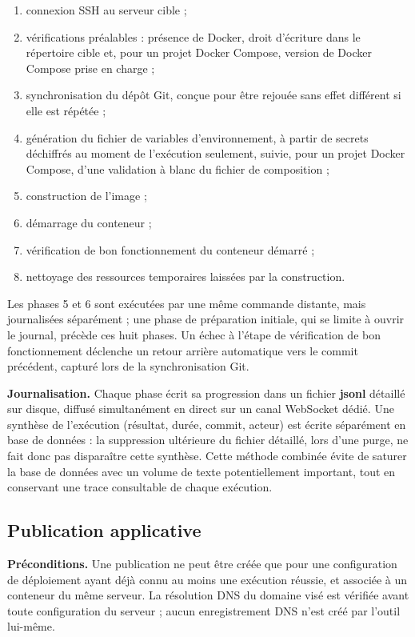 \begin{enumerate}
  \item connexion SSH au serveur cible ;
  \item vérifications préalables : présence de Docker, droit d'écriture
        dans le répertoire cible et, pour un projet Docker Compose,
        version de Docker Compose prise en charge ;
  \item synchronisation du dépôt Git, conçue pour être rejouée sans
        effet différent si elle est répétée ;
  \item génération du fichier de variables d'environnement, à partir de
        secrets déchiffrés au moment de l'exécution seulement, suivie,
        pour un projet Docker Compose, d'une validation à blanc du
        fichier de composition ;
  \item construction de l'image ;
  \item démarrage du conteneur ;
  \item vérification de bon fonctionnement du conteneur démarré ;
  \item nettoyage des ressources temporaires laissées par la
        construction.
\end{enumerate}

Les phases 5 et 6 sont exécutées par une même commande distante, mais
journalisées séparément ; une phase de préparation initiale, qui se
limite à ouvrir le journal, précède ces huit phases. Un échec à l'étape
de vérification de bon fonctionnement déclenche un retour arrière
automatique vers le commit précédent, capturé lors de la synchronisation
Git.

\textbf{Journalisation.} Chaque phase écrit sa progression dans un
fichier \textbf{jsonl} détaillé sur disque, diffusé simultanément en direct sur un
canal WebSocket dédié. Une synthèse de l'exécution (résultat, durée,
commit, acteur) est écrite séparément en base de données : la
suppression ultérieure du fichier détaillé, lors d'une purge, ne fait
donc pas disparaître cette synthèse. Cette méthode combinée évite de
saturer la base de données avec un volume de texte potentiellement
important, tout en conservant une trace consultable de chaque
exécution.

\subsection{Publication applicative}

\textbf{Préconditions.} Une publication ne peut être créée que pour une
configuration de déploiement ayant déjà connu au moins une exécution
réussie, et associée à un conteneur du même serveur. La résolution DNS
du domaine visé est vérifiée avant toute configuration du serveur ;
aucun enregistrement DNS n'est créé par l'outil lui-même.

